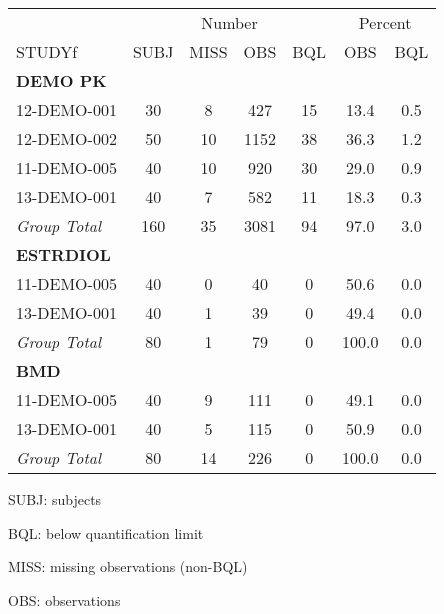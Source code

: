 \setlength{\tabcolsep}{5pt} 
\begin{threeparttable}
\renewcommand{\arraystretch}{1.3}
\begin{tabular}[h]{lcccccc}
\hline
\multicolumn{1}{c}{} & \multicolumn{4}{c}{Number} & \multicolumn{2}{c}{Percent} \\
\cmidrule(lr){2-5}
\cmidrule(lr){6-7}
STUDYf & SUBJ & MISS & OBS & BQL & OBS & BQL \\
\hline
\multicolumn{7}{l}{\textbf{DEMO PK}}\\%
12-DEMO-001 & 30 & 8 & 427 & 15 & 13.4 & 0.5 \\
12-DEMO-002 & 50 & 10 & 1152 & 38 & 36.3 & 1.2 \\
11-DEMO-005 & 40 & 10 & 920 & 30 & 29.0 & 0.9 \\
13-DEMO-001 & 40 & 7 & 582 & 11 & 18.3 & 0.3 \\
\hline {\it Group Total} & 160 & 35 & 3081 & 94 & 97.0 & 3.0 \\
\hline \multicolumn{7}{l}{\textbf{ESTRDIOL}}\\%
11-DEMO-005 & 40 & 0 & 40 & 0 & 50.6 & 0.0 \\
13-DEMO-001 & 40 & 1 & 39 & 0 & 49.4 & 0.0 \\
\hline {\it Group Total} & 80 & 1 & 79 & 0 & 100.0 & 0.0 \\
\hline \multicolumn{7}{l}{\textbf{BMD}}\\%
11-DEMO-005 & 40 & 9 & 111 & 0 & 49.1 & 0.0 \\
13-DEMO-001 & 40 & 5 & 115 & 0 & 50.9 & 0.0 \\
\hline {\it Group Total} & 80 & 14 & 226 & 0 & 100.0 & 0.0 \\
\hline
\end{tabular}
\begin{tablenotes}[flushleft]
\item SUBJ: subjects
\item BQL: below quantification limit
\item MISS: missing observations (non-BQL)
\item OBS: observations
\end{tablenotes}
\end{threeparttable}
